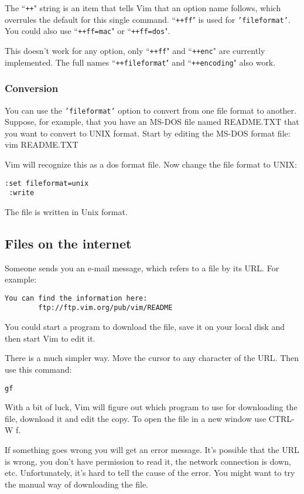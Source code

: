 The ``\texttt{++}" string is an item that tells Vim that an option name follows, which overrules the default for this single command.
``\texttt{++ff}" is used for \texttt{'fileformat'}.
You could also use ``\texttt{++ff=mac}" or ``\texttt{++ff=dos}".

This doesn't work for any option, only ``\texttt{++ff}" and ``\texttt{++enc}" are currently implemented.
The full names ``\texttt{++fileformat}" and ``\texttt{++encoding}" also work.
\subsubsection{Conversion}
You can use the \texttt{'fileformat'} option to convert from one file format to another.
Suppose, for example, that you have an MS-DOS file named README.TXT that you want to convert to UNIX format.
Start by editing the MS-DOS format file: vim README.TXT

Vim will recognize this as a dos format file.
Now change the file format to UNIX:

\begin{Verbatim}[samepage=true]
 :set fileformat=unix
 :write
\end{Verbatim}

The file is written in Unix format.
\subsection{Files on the internet}
Someone sends you an e-mail message, which refers to a file by its URL.
For example:

\begin{Verbatim}[samepage=true]
    You can find the information here:
        ftp://ftp.vim.org/pub/vim/README
\end{Verbatim}

You could start a program to download the file, save it on your local disk and then start Vim to edit it.

There is a much simpler way.
Move the cursor to any character of the URL.
Then use this command:

\begin{Verbatim}[samepage=true]
 gf
\end{Verbatim}

With a bit of luck, Vim will figure out which program to use for downloading the file, download it and edit the copy.
To open the file in a new window use CTRL-W f.

If something goes wrong you will get an error message.
It's possible that the URL is wrong, you don't have permission to read it, the network connection is down, etc.
Unfortunately, it's hard to tell the cause of the error.
You might want to try the manual way of downloading the file.


